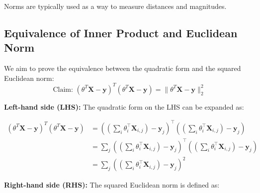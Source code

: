 Norms are typically used as a way to measure distances and magnitudes.


\subsection{Equivalence of Inner Product and Euclidean Norm}

We aim to prove the equivalence between the quadratic form and the squared Euclidean norm:
\begin{equation}
    \text{Claim: }(\theta^T \mathbf{X} - \mathbf{y})^T (\theta^T \mathbf{X} - \mathbf{y}) = \| \theta^T \mathbf{X} - \mathbf{y} \|_2^2
\end{equation}

\textbf{Left-hand side (LHS):} The quadratic form on the LHS can be expanded as:

\begin{align}
    (\theta^T \mathbf{X} - \mathbf{y})^T (\theta^T \mathbf{X} - \mathbf{y}) & = \left( \left( \sum_i \theta_i^\top \mathbf{X}_{i,j} \right) - \mathbf{y}_j \right)^\top \left( \left( \sum_i \theta_i^\top \mathbf{X}_{i,j} \right) - \mathbf{y}_j \right)         \\
                                                                            & = \sum_j \left( \left( \sum_i \theta_i^\top \mathbf{X}_{i,j} \right) - \mathbf{y}_j \right) ^\top \left( \left( \sum_i \theta_i^\top \mathbf{X}_{i,j} \right) - \mathbf{y}_j \right) \\
                                                                            & = \sum_j \left( \left( \sum_i \theta_i^\top \mathbf{X}_{i,j} \right) - \mathbf{y}_j \right)^2
\end{align}

\bigskip

\textbf{Right-hand side (RHS):} The squared Euclidean norm is defined as:

